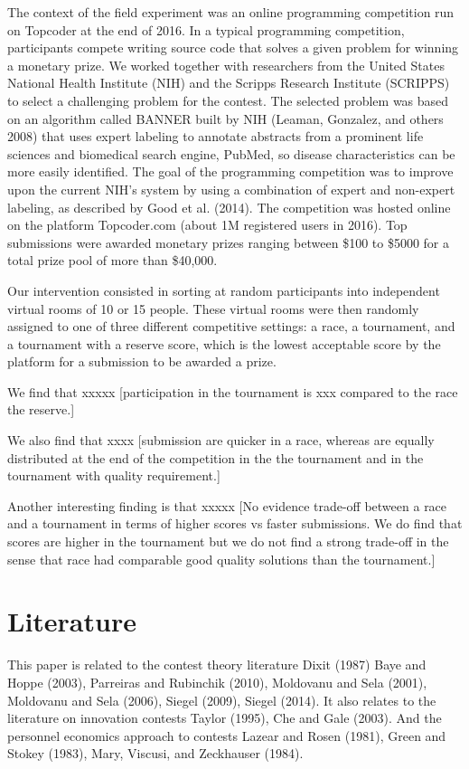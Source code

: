 \documentclass[10pt, titlepage]{article}
\begin{document}
The context of the field experiment was an online programming
competition run on Topcoder at the end of 2016. In a typical programming
competition, participants compete writing source code that solves a
given problem for winning a monetary prize. We worked together with
researchers from the United States National Health Institute (NIH) and
the Scripps Research Institute (SCRIPPS) to select a challenging problem
for the contest. The selected problem was based on an algorithm called
BANNER built by NIH (Leaman, Gonzalez, and others 2008) that uses expert
labeling to annotate abstracts from a prominent life sciences and
biomedical search engine, PubMed, so disease characteristics can be more
easily identified. The goal of the programming competition was to
improve upon the current NIH's system by using a combination of expert
and non-expert labeling, as described by Good et al. (2014). The
competition was hosted online on the platform Topcoder.com (about 1M
registered users in 2016). Top submissions were awarded monetary prizes
ranging between \$100 to \$5000 for a total prize pool of more than
\$40,000.

Our intervention consisted in sorting at random participants into
independent virtual rooms of 10 or 15 people. These virtual rooms were
then randomly assigned to one of three different competitive settings: a
race, a tournament, and a tournament with a reserve score, which is the
lowest acceptable score by the platform for a submission to be awarded a
prize.

We find that xxxxx {[}participation in the tournament is xxx compared to
the race the reserve.{]}

We also find that xxxx {[}submission are quicker in a race, whereas are
equally distributed at the end of the competition in the the tournament
and in the tournament with quality requirement.{]}

Another interesting finding is that xxxxx {[}No evidence trade-off
between a race and a tournament in terms of higher scores vs faster
submissions. We do find that scores are higher in the tournament but we
do not find a strong trade-off in the sense that race had comparable
good quality solutions than the tournament.{]}

\section{Literature}\label{literature}

This paper is related to the contest theory literature Dixit (1987) Baye
and Hoppe (2003), Parreiras and Rubinchik (2010), Moldovanu and Sela
(2001), Moldovanu and Sela (2006), Siegel (2009), Siegel (2014). It also
relates to the literature on innovation contests Taylor (1995), Che and
Gale (2003). And the personnel economics approach to contests Lazear and
Rosen (1981), Green and Stokey (1983), Mary, Viscusi, and Zeckhauser
(1984).
\end{document}
